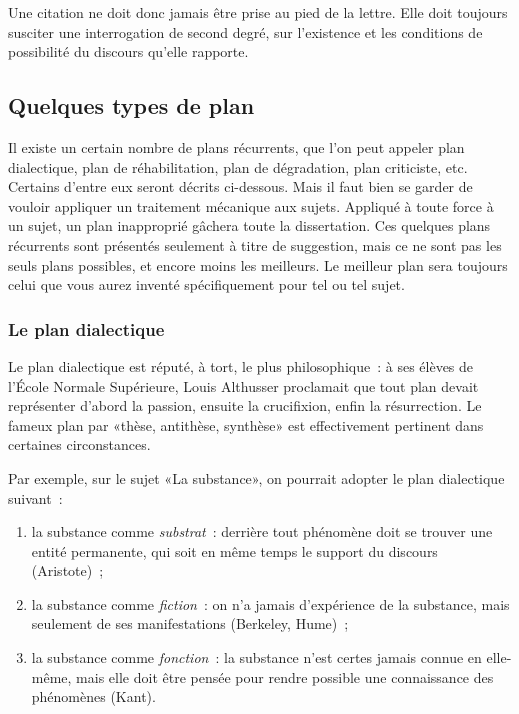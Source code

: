 \documentclass[a4paper,11pt]{article}
\begin{document}
\par

Une citation ne doit donc jamais être prise au pied de la lettre. Elle
doit toujours susciter une interrogation de second degré, sur
l'existence et les conditions de possibilité du discours qu'elle
rapporte.



\subsection{Quelques types de plan}

Il existe un certain nombre de plans récurrents, que l'on peut appeler
plan dialectique, plan de réhabilitation, plan de dégradation, plan
criticiste, etc. Certains d'entre eux seront décrits ci-dessous. Mais il
faut bien se garder de vouloir appliquer un traitement mécanique aux
sujets. Appliqué à toute force à un sujet, un plan inapproprié gâchera
toute la dissertation. Ces quelques plans récurrents sont présentés
seulement à titre de suggestion, mais ce ne sont pas les seuls plans
possibles, et encore moins les meilleurs. Le meilleur plan sera toujours
celui que vous aurez inventé spécifiquement pour tel ou tel sujet.


\subsubsection{Le plan dialectique}

Le plan dialectique est réputé, à tort, le plus philosophique~: à ses
élèves de l'École Normale Supérieure, Louis Althusser proclamait que
tout plan devait représenter d'abord la passion, ensuite la crucifixion,
enfin la résurrection. Le fameux plan par «thèse, antithèse, synthèse»
est effectivement pertinent dans certaines circonstances.

\par

Par exemple, sur le sujet «La substance», on pourrait adopter le plan
dialectique suivant~:
\begin{enumerate}
\item la substance comme \emph{substrat}~: derrière tout phénomène doit
  se trouver une entité permanente, qui soit en même temps le support du
  discours (Aristote)~;
\item la substance comme \emph{fiction}~: on n'a jamais d'expérience de
  la substance, mais seulement de ses manifestations (Berkeley, Hume)~;
\item la substance comme \emph{fonction}~: la substance n'est certes
  jamais connue en elle-même, mais elle doit être pensée pour rendre
  possible une connaissance des phénomènes (Kant).
\end{enumerate}
\end{document}
